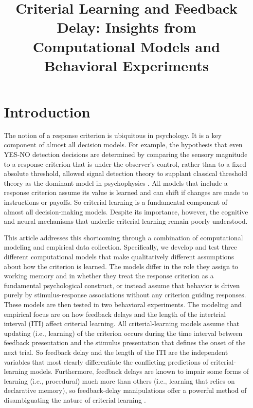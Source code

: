 \documentclass[doc, floatsintext]{apa7}
\title{Criterial Learning and Feedback Delay: Insights from
Computational Models and Behavioral Experiments}
\begin{document}
\maketitle 

\section{Introduction}
The notion of a response criterion is ubiquitous in
psychology. It is a key component of almost all decision
models. For example, the hypothesis that even YES-NO
detection decisions are determined by comparing the sensory
magnitude to a response criterion that is under the
observer's control, rather than to a fixed absolute
threshold, allowed signal detection theory to supplant
classical threshold theory as the dominant model in
psychophysics \parencite{GreenSwets1966}. All models that
include a response criterion assume its value is learned and
can shift if changes are made to instructions or payoffs. So
criterial learning is a fundamental component of almost all
decision-making models. Despite its importance, however, the
cognitive and neural mechanisms that underlie criterial
learning remain poorly understood.

This article addresses this shortcoming through a
combination of computational modeling and empirical data
collection. Specifically, we develop and test three
different computational models that make qualitatively
different assumptions about how the criterion is learned.
The models differ in the role they assign to working memory
and in whether they treat the response criterion as a
fundamental psychological construct, or instead assume that
behavior is driven purely by stimulus-response associations
without any criterion guiding responses. These models are
then tested in two behavioral experiments. The modeling and
empirical focus are on how feedback delays and the length of
the intertrial interval (ITI) affect criterial learning. All
criterial-learning models assume that updating (i.e.,
learning) of the criterion occurs during the time interval
between feedback presentation and the stimulus presentation
that defines the onset of the next trial. So feedback delay
and the length of the ITI are the independent variables that
most clearly differentiate the conflicting predictions of
criterial-learning models. Furthermore, feedback delays are
known to impair some forms of learning (i.e., procedural)
much more than others (i.e., learning that relies on
declarative memory), so feedback-delay manipulations offer a
powerful method of disambiguating the nature of criterial
learning \parencite{ell2009critrial, MaddoxAshbyBohil2003,
MaddoxIng2005}.
\end{document}
